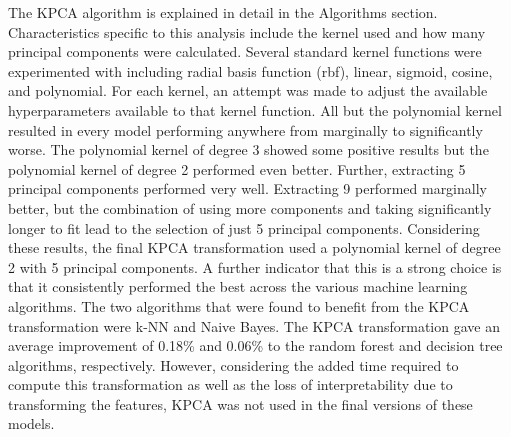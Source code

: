 \documentclass[titlepage]{article}
\begin{document}
The KPCA algorithm is explained in detail in the Algorithms section. Characteristics specific to this analysis include the kernel used and how many principal components were calculated. Several standard kernel functions were experimented with including radial basis function (rbf), linear, sigmoid, cosine, and polynomial. For each kernel, an attempt was made to adjust the available hyperparameters available to that kernel function. All but the polynomial kernel resulted in every model performing anywhere from marginally to significantly worse. The polynomial kernel of degree 3 showed some positive results but the polynomial kernel of degree 2 performed even better. Further, extracting 5 principal components performed very well. Extracting 9 performed marginally better, but the combination of using more components and taking significantly longer to fit lead to the selection of just 5 principal components. Considering these results, the final KPCA transformation used a polynomial kernel of degree 2 with 5 principal components. A further indicator that this is a strong choice is that it consistently performed the best across the various machine learning algorithms. The two algorithms that were found to benefit from the KPCA transformation were k-NN and Naive Bayes. The KPCA transformation gave an average improvement of 0.18\% and 0.06\% to the random forest and decision tree algorithms, respectively. However, considering the added time required to compute this transformation as well as the loss of interpretability due to transforming the features, KPCA was not used in the final versions of these models.
\end{document}
